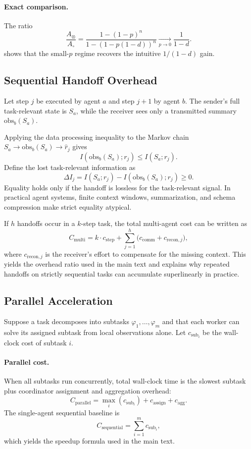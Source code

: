 \paragraph{Exact comparison.}
The ratio
\[
\frac{A_{\otimes}}{A_{\circ}}
=
\frac{1-(1-p)^n}{1-(1-p(1-d))^n}
\xrightarrow[p \to 0]{} \frac{1}{1-d}.
\]
shows that the small-$p$ regime recovers the intuitive $1/(1-d)$ gain.

\subsection{Sequential Handoff Overhead}

Let step $j$ be executed by agent $a$ and step $j+1$ by agent $b$. The sender's full task-relevant state
is $S_a$, while the receiver sees only a transmitted summary $\mathrm{obs}_b(S_a)$.

Applying the data processing inequality to the Markov chain
$S_a \to \mathrm{obs}_b(S_a) \to \hat r_j$ gives
\[
I(\mathrm{obs}_b(S_a); r_j) \le I(S_a; r_j).
\]
Define the lost task-relevant information as
\[
\Delta I_j = I(S_a; r_j) - I(\mathrm{obs}_b(S_a); r_j) \ge 0.
\]
Equality holds only if the handoff is lossless for the task-relevant signal. In practical agent systems,
finite context windows, summarization, and schema compression make strict equality atypical.

If $h$ handoffs occur in a $k$-step task, the total multi-agent cost can be written as
\[
C_{\mathrm{multi}}
=
k \cdot c_{\mathrm{step}} + \sum_{j=1}^{h} \bigl(c_{\mathrm{comm}} + c_{\mathrm{recon},j}\bigr),
\]
where $c_{\mathrm{recon},j}$ is the receiver's effort to compensate for the missing context. This yields
the overhead ratio used in the main text and explains why repeated handoffs on strictly sequential tasks
can accumulate superlinearly in practice.

\subsection{Parallel Acceleration}

Suppose a task decomposes into subtasks $\varphi_1,\dots,\varphi_m$ and that each worker can solve its
assigned subtask from local observations alone. Let $c_{\mathrm{sub}_i}$ be the wall-clock cost of
subtask $i$.

\paragraph{Parallel cost.}
When all subtasks run concurrently, total wall-clock time is the slowest subtask plus coordinator
assignment and aggregation overhead:
\[
C_{\mathrm{parallel}} = \max_i(c_{\mathrm{sub}_i}) + c_{\mathrm{assign}} + c_{\mathrm{agg}}.
\]
The single-agent sequential baseline is
\[
C_{\mathrm{sequential}} = \sum_{i=1}^{m} c_{\mathrm{sub}_i},
\]
which yields the speedup formula used in the main text.

